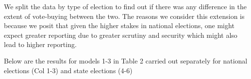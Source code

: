 \documentclass[12pt]{article}
\begin{document}
We split the data by type of election to find out if there was any difference in the extent of vote-buying between the two. The reasons we consider this extension is because we posit that given the higher stakes in national elections, one might expect greater reporting due to greater scrutiny and security which might also lead to higher reporting. 

Below are the results for models 1-3 in Table 2 carried out separately for national elections (Col 1-3) and state elections (4-6) 

\FloatBarrier
\begin{table}[]
    \caption*{Extension of Table 2 with Subsetting For National and State Elections}
 \singlespacing   
    \centering
{    
}
\end{table}
\FloatBarrier
\end{document}
